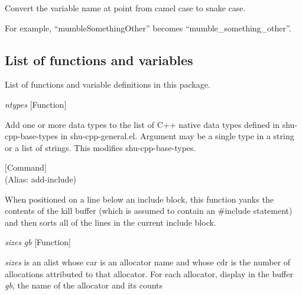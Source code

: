 \begin{doc-string}
Convert the variable name at point from camel case to snake case.

For example, ``mumbleSomethingOther'' becomes ``mumble\_something\_other''.
\end{doc-string}

\subsection{List of functions and variables}

List of functions and variable definitions in this package.



\vspace{1em}
\noindent
{}
\usebox{\funcname}\emph{ntypes}
 \hfill [Function]

\begin{doc-string}
Add one or more data types to the list of C++ native data types defined in shu-cpp-base-types
in shu-cpp-general.el.  Argument may be a single type in a string or a list of strings.
This modifies shu-cpp-base-types.
\end{doc-string}

\vspace{1em}
\noindent
{}
\usebox{\funcname}
 \hfill [Command]\\%
 (Alias: add-include)

\begin{doc-string}
When positioned on a line below an include block, this function yanks the
contents of the kill buffer (which is assumed to contain an \#include statement)
and then sorts all of the lines in the current include block.
\end{doc-string}

\vspace{1em}
\noindent
{}
\usebox{\funcname}\emph{sizes} \emph{gb}
 \hfill [Function]

\begin{doc-string}
\emph{sizes} is an alist whose car is an allocator name and whose cdr is the number of
allocations attributed to that allocator.  For each allocator, display in the
buffer \emph{gb}, the name of the allocator and its counts
\end{doc-string}

